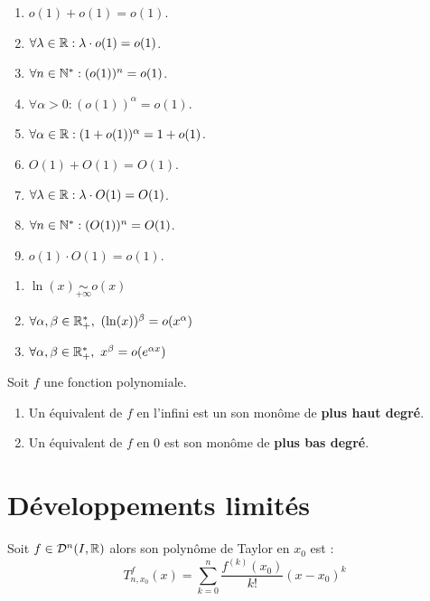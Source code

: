 \begin{proposition}
	\begin{enumerate}
        \item $o(1) + o(1) = o(1)$.
        \item $\forall \lambda \in \mathbb{R} : \lambda \cdot o(1) = o(1)$.
        \item $\forall n \in \mathbb{N}^* : (o(1))^n = o(1)$.
        \item $\forall \alpha > 0 : (o(1))^{\alpha} = o(1)$.
        \item $\forall \alpha \in \mathbb{R} : (1 + o(1))^{\alpha} = 1 + o(1)$.
        \item $O(1) + O(1) = O(1)$.
        \item $\forall \lambda \in \mathbb{R} : \lambda \cdot O(1) = O(1)$.
        \item $\forall n \in \mathbb{N}^* : (O(1))^n = O(1)$.
        \item $o(1) \cdot O(1) = o(1)$.
    \end{enumerate}
\end{proposition}

\begin{proposition}
	\begin{enumerate}
        \item $\ln(x) \underset{+\infty}{\sim} o(x)$
        \item $\forall \alpha, \beta \in \R_+^*,\ (\ln(x))^{\beta} = o(x^{\alpha})$
        \item $\forall \alpha, \beta \in \R_+^*,\ x^{\beta} = o(e^{\alpha x})$
    \end{enumerate}
\end{proposition}

\begin{proposition}
    Soit $f$ une fonction polynomiale. 
    \begin{enumerate}
        \item Un équivalent de $f$ en l'infini est un son monôme de \textbf{plus haut degré}.
        \item Un équivalent de $f$ en 0 est son monôme de \textbf{plus bas degré}.
    \end{enumerate}
\end{proposition}

\section{Développements limités}

\begin{definition}
    Soit $f \in \mathcal{D}^n(I, \mathbb{R})$ alors son polynôme de Taylor en $x_0$ est :
    \[ T_{n, x_0}^f(x) = \sum_{k = 0}^{n} \frac{f^{(k)}(x_0)}{k!} (x - x_0)^k \]
\end{definition}

